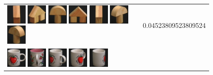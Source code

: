 {\begin{figure}[p]
\begin{tabular}{m{11cm} | m{3cm} |}
\includegraphics[width=1cm]{coil/beeld-44.eps}
\includegraphics[width=1cm]{coil/beeld-45.eps}
\includegraphics[width=1cm]{coil/beeld-1.eps}
\includegraphics[width=1cm]{coil/beeld-43.eps}
\includegraphics[width=1cm]{coil/beeld-47.eps}
\includegraphics[width=1cm]{coil/beeld-3.eps}
\includegraphics[width=1cm]{coil/beeld-4.eps}
& {\scriptsize 0.04523809523809524}
\\
\includegraphics[width=1cm]{coil/beeld-36.eps}
\includegraphics[width=1cm]{coil/beeld-11.eps}
\includegraphics[width=1cm]{coil/beeld-40.eps}
\includegraphics[width=1cm]{coil/beeld-39.eps}
\includegraphics[width=1cm]{coil/beeld-38.eps}

\end{tabular}
\end{figure}}
